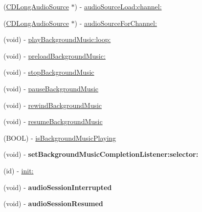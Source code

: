 \begin{DoxyCompactItemize}
\item 
(\hyperlink{interfaceCDLongAudioSource}{C\+D\+Long\+Audio\+Source} $\ast$) -\/ \hyperlink{interfaceCDAudioManager_a34c37890b0e9b8995230d1bdc9afa5a7}{audio\+Source\+Load\+:channel\+:}
\item 
(\hyperlink{interfaceCDLongAudioSource}{C\+D\+Long\+Audio\+Source} $\ast$) -\/ \hyperlink{interfaceCDAudioManager_a07f9dbc2d03a610a187675c6cfb24893}{audio\+Source\+For\+Channel\+:}
\item 
(void) -\/ \hyperlink{interfaceCDAudioManager_a940bfd555f763ee56217b6d589cb6a30}{play\+Background\+Music\+:loop\+:}
\item 
(void) -\/ \hyperlink{interfaceCDAudioManager_a613d13a6227a90dd5a073dbde1ac447b}{preload\+Background\+Music\+:}
\item 
(void) -\/ \hyperlink{interfaceCDAudioManager_a2403abdc32f144a0d57d915db42d35a6}{stop\+Background\+Music}
\item 
(void) -\/ \hyperlink{interfaceCDAudioManager_acbd505494ec2f01e484dfca635b208b8}{pause\+Background\+Music}
\item 
(void) -\/ \hyperlink{interfaceCDAudioManager_a98e99a2b9eabcf89ad7419f6f809c65a}{rewind\+Background\+Music}
\item 
(void) -\/ \hyperlink{interfaceCDAudioManager_a9bcc620677df7b828dd69c951b445062}{resume\+Background\+Music}
\item 
(B\+O\+OL) -\/ \hyperlink{interfaceCDAudioManager_a3b519950dee5dd8e79c8bbbf3c0f7e26}{is\+Background\+Music\+Playing}
\item 
\mbox{\label{interfaceCDAudioManager_ae333be8046b55eabda5cd6ffbf1ecf9b}} 
(void) -\/ {\bfseries set\+Background\+Music\+Completion\+Listener\+:selector\+:}
\item 
(id) -\/ \hyperlink{interfaceCDAudioManager_ae2d8ef3daed8297ee37cd14b67687407}{init\+:}
\item 
\mbox{\label{interfaceCDAudioManager_aeeaf362faad4417ac15d22e0862c1641}} 
(void) -\/ {\bfseries audio\+Session\+Interrupted}
\item 
\mbox{\label{interfaceCDAudioManager_a844dd2990cbadb04e35364abed23f690}} 
(void) -\/ {\bfseries audio\+Session\+Resumed}
\item 
\mbox{\label{interfaceCDAudioManager_a861e77b8bef383849bc2335eaec5bff8}} 

\end{DoxyCompactItemize}
